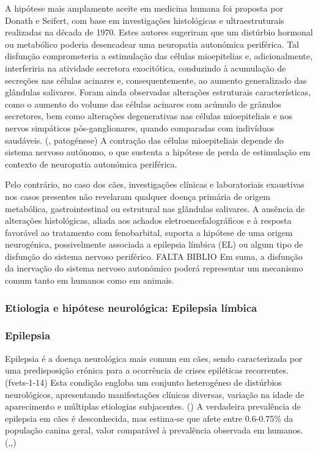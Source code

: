 A hipótese mais amplamente aceite em medicina humana foi proposta por Donath e Seifert, com base em investigações histológicas e ultraestruturais realizadas na década de 1970. Estes autores sugeriram que um distúrbio hormonal ou metabólico poderia desencadear uma neuropatia autonómica periférica. \cite{Davis2021} Tal disfunção comprometeria a estimulação das células mioepitelias e, adicionalmente, interferiria na atividade secretora exocitótica, conduzindo à acumulação de secreções nas células acinares e, consequentemente, ao aumento generalizado das glândulas salivares. \cite{Ihrler2010} Foram ainda observadas alterações estruturais características, como o aumento do volume das células acinares com acúmulo de grânulos secretores, bem como alterações degenerativas nas células mioepiteliais e nos nervos simpáticos pós-ganglionares, quando comparadas com indivíduos saudáveis. (\cite{Davis2021}, patogénese) A contração das células mioepiteliais depende do sistema nervoso autónomo, o que sustenta a hipótese de perda de estimulação em contexto de neuropatia autonómica periférica. \cite{Ihrler2010}


Pelo contrário, no caso dos cães, investigações clínicas e laboratoriais exaustivas nos casos presentes não revelaram qualquer doença primária de origem metabólica, gastrointestinal ou estrutural nas glândulas salivares. A ausência de alterações histológicas, aliada aos achados eletroencefalográficos e à resposta favorável ao tratamento com fenobarbital, suporta a hipótese de uma origem neurogénica, possivelmente associada a epilepsia límbica (EL) ou algum tipo de disfunção do sistema nervoso periférico. FALTA BIBLIO
Em suma, a disfunção da inervação do sistema nervoso autonómico poderá representar um mecanismo comum tanto em humanos como em animais. \cite{Alcoverro2014}


\subsubsection{Etiologia e hipótese neurológica: Epilepsia límbica}

\subsubsection{Epilepsia}

Epilepsia é a doença neurológica mais comum em cães, sendo caracterizada por uma predisposição crónica para a ocorrência de crises epiléticas recorrentes. (fvets-1-14) Esta condição engloba um conjunto heterogéneo de distúrbios neurológicos, apresentando manifestações clínicas diversas, variação na idade de aparecimento e múltiplas etiologias subjacentes. (\cite{loscher_dogs_2022}) 
A verdadeira prevalência de epilepsia em cães é desconhecida, mas estima-se que afete entre 0.6-0.75\% da população canina geral, valor comparável à prevalência observada em humanos. (\cite{von_ruden_role_2023},\cite{Packer2015},\cite{loscher_dogs_2022})


